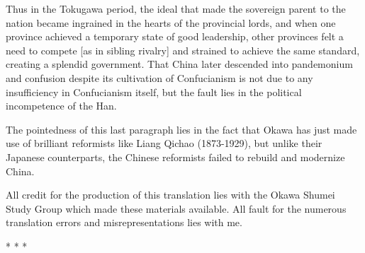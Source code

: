 Thus in the Tokugawa period, the ideal that made the sovereign parent to the nation became ingrained in the hearts of the provincial lords, and when one province achieved a temporary state of good leadership, other provinces felt a need to compete [as in sibling rivalry] and strained to achieve the same standard, creating a splendid government. That China later descended into pandemonium and confusion despite its cultivation of Confucianism is not due to any insufficiency in Confucianism itself, but the fault lies in the political incompetence of the Han.

\begin{quotex}
The pointedness of this last paragraph lies in the fact that Okawa has just made use of brilliant reformists like Liang Qichao (1873-1929), but unlike their Japanese counterparts, the Chinese reformists failed to rebuild and modernize China.

All credit for the production of this translation lies with the Okawa Shumei Study Group which made these materials available. All fault for the numerous translation errors and misrepresentations lies with me.

\end{quotex}



\begin{center}* * *\end{center}

